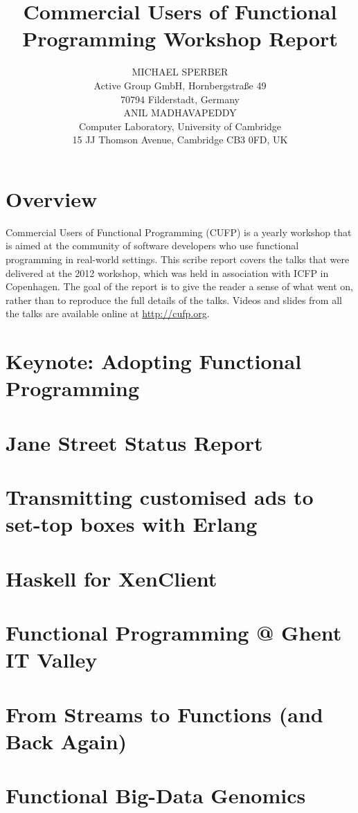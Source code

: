 \documentclass{jfp1}
\title[Commercial Users of Functional Programming 2012]
      {Commercial Users of Functional Programming Workshop Report}
\author[Michael Sperber and Anil Madhavapeddy]
       {MICHAEL SPERBER\\
         Active Group GmbH, Hornbergstra\ss{}e 49\\
         70794 Filderstadt, Germany\\
         ANIL MADHAVAPEDDY\\
        Computer Laboratory, University of Cambridge\\ 
        15 JJ Thomson Avenue, Cambridge CB3 0FD, UK}
\begin{document}
\label{firstpage}
\maketitle

\section{Overview}

Commercial Users of Functional Programming (CUFP) is a yearly workshop
that is aimed at the community of software developers who use functional
programming in real-world settings.  This scribe report covers the talks
that were delivered at the 2012 workshop, which was held in association
with ICFP in Copenhagen.  The goal of the report is to give the reader
a sense of what went on, rather than to reproduce the full details
of the talks.  Videos and slides from all the talks are available online at \url{http://cufp.org}.

\section{Keynote: Adopting Functional Programming}

\section{Jane Street Status Report}

\section{Transmitting customised ads to set-top boxes with Erlang}

\section{Haskell for XenClient}

\section{Functional Programming @ Ghent IT Valley}

\section{From Streams to Functions (and Back Again)}

\section{Functional Big-Data Genomics}
\end{document}
